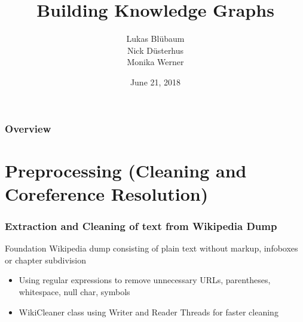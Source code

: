 \documentclass{beamer}
\title[BKG]{Building Knowledge Graphs} %
\author[Data Science]{Lukas Bl{\"u}baum \\ Nick D{\"u}sterhus \\ Monika Werner} %
\institute[UPB] %
{
University of Paderborn \\ %
\medskip
\textit{https://github.com/LukasBluebaum/BKG} %
}
\date{June 21, 2018} %
\begin{document}
\begin{frame}
\titlepage %
\end{frame}

\begin{frame}
\frametitle{Overview} %
\tableofcontents %
\end{frame}


\section{Preprocessing (Cleaning and Coreference Resolution)} %

\begin{frame}
\frametitle{Extraction and Cleaning of text from Wikipedia Dump}
\begin{block}{Foundation}
	Wikipedia dump consisting of plain text without markup, infoboxes or chapter subdivision 
\end{block}
\begin{itemize}
	\item Using regular expressions to remove unnecessary URLs, parentheses, whitespace, null char, symbols
	\item WikiCleaner class using Writer and Reader Threads for faster cleaning
\end{itemize}
\end{frame}

\end{document}
